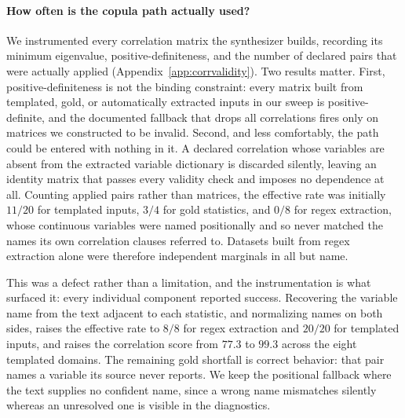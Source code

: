 \documentclass[letterpaper]{article} %
\begin{document}
\paragraph{How often is the copula path actually used?}
We instrumented every correlation matrix the synthesizer builds, recording its
minimum eigenvalue, positive-definiteness, and the number of declared pairs
that were actually applied (Appendix~\ref{app:corrvalidity}). Two results
matter. First, positive-definiteness is not the binding constraint: every
matrix built from templated, gold, or automatically extracted inputs in our
sweep is positive-definite, and the documented fallback that drops all
correlations fires only on matrices we constructed to be invalid. Second, and
less comfortably, the path could be entered with nothing in it. A declared
correlation whose variables are absent from the extracted variable dictionary
is discarded silently, leaving an identity matrix that passes every validity
check and imposes no dependence at all. Counting applied pairs rather than
matrices, the effective rate was initially $11/20$ for templated inputs, $3/4$
for gold statistics, and $0/8$ for regex extraction, whose continuous variables
were named positionally and so never matched the names its own correlation
clauses referred to. Datasets built from regex extraction alone were therefore
independent marginals in all but name.

This was a defect rather than a limitation, and the instrumentation is what
surfaced it: every individual component reported success. Recovering the
variable name from the text adjacent to each statistic, and normalizing names
on both sides, raises the effective rate to $8/8$ for regex extraction and
$20/20$ for templated inputs, and raises the correlation score from $77.3$ to
$99.3$ across the eight templated domains. The remaining gold shortfall is
correct behavior: that pair names a variable its source never reports. We keep
the positional fallback where the text supplies no confident name, since a
wrong name mismatches silently whereas an unresolved one is visible in the
diagnostics.
\end{document}
